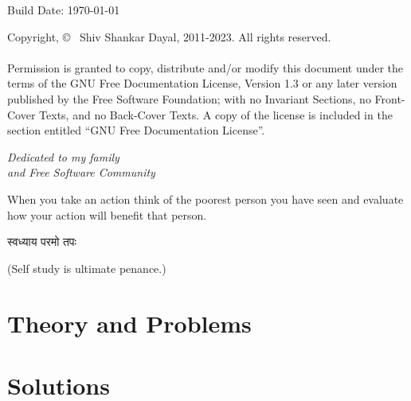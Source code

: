 \documentclass[9pt, oneside, b5paper, openright]{memoir}
\title{\sffamily\color{nicecyan}\HUGE{\textbf{A Variable in Algebra}}}
\author{\vspace*{1cm}\LARGE{Shiv S. Dayal}}
\date{}
\begin{document}

\thispagestyle{empty}
\pagestyle{empty}
\vfill
\newpage
\vspace*{5in}
Build Date: \today
\vspace*{0.2in}

Copyright, \copyright~ Shiv Shankar Dayal, 2011-2023. All rights reserved.\\\\
Permission is granted to copy, distribute and/or modify this document under the
terms of the GNU Free Documentation License, Version 1.3 or any later version
published by the Free Software Foundation; with no Invariant Sections, no
Front-Cover Texts, and no Back-Cover Texts. A copy of the license is included
in the section entitled ``GNU Free Documentation License''.
\newpage
\vspace*{2in}
\begin{center}
  \Large \it Dedicated to my family\\and Free Software Community
\end{center}
\vspace*{1cm}
\begin{center}
  \large When you take an action think of the poorest person you have seen and evaluate how
  your action will benefit that person.
\end{center}
\begin{center}
\begin{sanskrit}
  स्वध्याय परमो तपः
\end{sanskrit}
(Self study is ultimate penance.)
\end{center}
\newpage
\setcounter{page}{1}
\tableofcontents
\newpage
\pagestyle{fancy}
\frontmatter
\setcounter{page}{1}

\newpage
\mainmatter
{}
\part{Theory and Problems}










\part{Solutions}

\backmatter

\printindex
\end{document}
